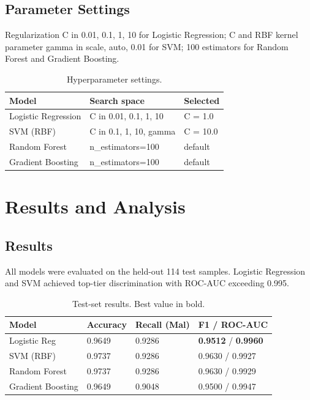 \documentclass[conference]{IEEEtran}
\begin{document}
\subsection{Parameter Settings}
Regularization C in {0.01, 0.1, 1, 10} for Logistic Regression; C and RBF kernel parameter gamma in {scale, auto, 0.01} for SVM; 100 estimators for Random Forest and Gradient Boosting.

\begin{table}[htbp]
\caption{Hyperparameter settings.}
\label{tab:hyperparameters}
\centering
\begin{tabular}{lll}
\toprule
\textbf{Model} & \textbf{Search space} & \textbf{Selected} \\
\midrule
Logistic Regression & C in {0.01, 0.1, 1, 10} & C = 1.0 \\
SVM (RBF) & C in {0.1, 1, 10}, gamma & C = 10.0 \\
Random Forest & n\_estimators=100 & default \\
Gradient Boosting & n\_estimators=100 & default \\
\bottomrule
\end{tabular}
\end{table}

\section{Results and Analysis}
\subsection{Results}
All models were evaluated on the held-out 114 test samples. Logistic Regression and SVM achieved top-tier discrimination with ROC-AUC exceeding 0.995.

\begin{table}[htbp]
\caption{Test-set results. Best value in bold.}
\label{tab:results}
\centering
\begin{tabular}{llll}
\toprule
\textbf{Model} & \textbf{Accuracy} & \textbf{Recall (Mal)} & \textbf{F1 / ROC-AUC} \\
\midrule
Logistic Reg & 0.9649 & 0.9286 & \textbf{0.9512} / \textbf{0.9960} \\
SVM (RBF) & 0.9737 & 0.9286 & 0.9630 / 0.9927 \\
Random Forest & 0.9737 & 0.9286 & 0.9630 / 0.9929 \\
Gradient Boosting & 0.9649 & 0.9048 & 0.9500 / 0.9947 \\
\bottomrule
\end{tabular}
\end{table}
\end{document}
